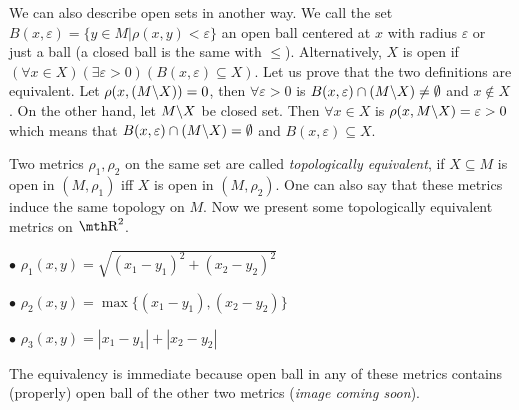 \medskip

We can also describe open sets in another way. We call the set $B(x,
\varepsilon) = \{y\in M|\rho(x,y)<\varepsilon\}$ an open ball centered at $x$ 
with radius $\varepsilon$ or just a ball (a closed ball is the same with 
$\leq$). Alternatively, $X$ is open if $(\forall x\in X)(\exists \varepsilon 
> 0)(B(x,\varepsilon)\subseteq X)$. Let us prove that the two definitions 
are equivalent. Let $\rho(x,(M\backslash X)) = 0$, then $\forall \varepsilon > 0$ 
is $B(x,\varepsilon) \cap (M\backslash X) \neq \emptyset$ and $x\notin X$.
On the other hand, let $M\backslash X$ be closed set. Then $\forall x\in X$ is $\rho
(x,M\backslash X) = \varepsilon > 0$ which means that $B(x,\varepsilon) \cap (M\backslash X) 
= \emptyset$ and $B(x,\varepsilon) \subseteq X$.

\medskip

 Two metrics $\rho_1,\rho_2$ on the same set are 
called {\it topologically equivalent}, if $X\subseteq M$ is open in $(M,\rho_1)$ 
iff $X$ is open in $(M,\rho_2)$. One can also say that these metrics induce the 
same topology on $M$.
\medskip
Now we present some topologically equivalent metrics on $\R^2$.
{\parindent0.5in\parskip6pt
	\item{$\bullet$} $\rho_1(x,y) = \sqrt{ (x_1 - y_1)^2 + (x_2 - y_2)^2 }$
	\item{$\bullet$} $\rho_2(x,y) = \max\{(x_1 - y_1),(x_2-y_2)\}$
	\item{$\bullet$} $\rho_3(x,y) = |x_1 - y_1| + |x_2-y_2|$

}
The equivalency is immediate because open ball in any of these metrics contains
(properly) open ball of the other two metrics ({\it image coming soon}).

